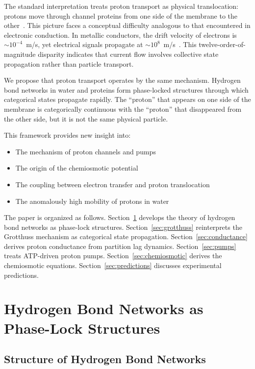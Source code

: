 \documentclass[twocolumn,showpacs,preprintnumbers,amsmath,amssymb,prd]{revtex4-2}
\begin{document}
The standard interpretation treats proton transport as physical translocation: protons move through channel proteins from one side of the membrane to the other~\cite{Nicholls2013}. This picture faces a conceptual difficulty analogous to that encountered in electronic conduction. In metallic conductors, the drift velocity of electrons is $\sim 10^{-4}$~m/s, yet electrical signals propagate at $\sim 10^8$~m/s~\cite{Griffiths2017}. This twelve-order-of-magnitude disparity indicates that current flow involves collective state propagation rather than particle transport.

We propose that proton transport operates by the same mechanism. Hydrogen bond networks in water and proteins form phase-locked structures through which categorical states propagate rapidly. The ``proton'' that appears on one side of the membrane is categorically continuous with the ``proton'' that disappeared from the other side, but it is not the same physical particle.

This framework provides new insight into:
\begin{itemize}
\item The mechanism of proton channels and pumps
\item The origin of the chemiosmotic potential
\item The coupling between electron transfer and proton translocation
\item The anomalously high mobility of protons in water
\end{itemize}

The paper is organized as follows. Section~\ref{sec:hydrogen_networks} develops the theory of hydrogen bond networks as phase-lock structures. Section~\ref{sec:grotthuss} reinterprets the Grotthuss mechanism as categorical state propagation. Section~\ref{sec:conductance} derives proton conductance from partition lag dynamics. Section~\ref{sec:pumps} treats ATP-driven proton pumps. Section~\ref{sec:chemiosmotic} derives the chemiosmotic equations. Section~\ref{sec:predictions} discusses experimental predictions.


\section{Hydrogen Bond Networks as Phase-Lock Structures}
\label{sec:hydrogen_networks}

\subsection{Structure of Hydrogen Bond Networks}
\end{document}
